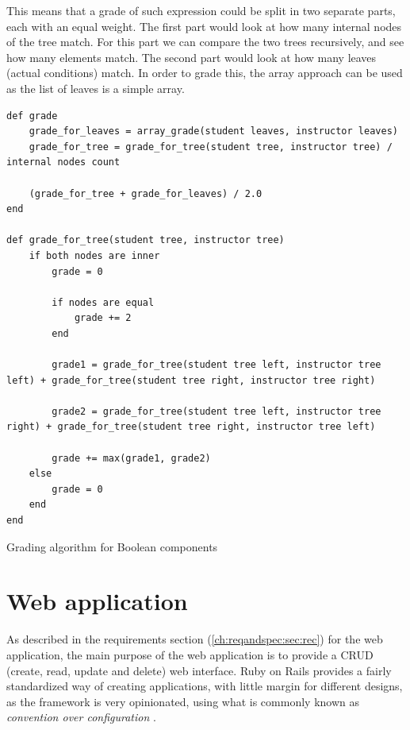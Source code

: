 This means that a grade of such expression could be split in two separate parts, each with an equal weight. The first part would look at how many internal nodes of the tree match. For this part we can compare the two trees recursively, and see how many elements match. The second part would look at how many leaves (actual conditions) match. In order to grade this, the array approach can be used as the list of leaves is a simple array.

\begin{code}
\begin{verbatim}
def grade
    grade_for_leaves = array_grade(student leaves, instructor leaves)
    grade_for_tree = grade_for_tree(student tree, instructor tree) / internal nodes count
    
    (grade_for_tree + grade_for_leaves) / 2.0
end

def grade_for_tree(student tree, instructor tree)
    if both nodes are inner
        grade = 0
        
        if nodes are equal
            grade += 2
        end
        
        grade1 = grade_for_tree(student tree left, instructor tree left) + grade_for_tree(student tree right, instructor tree right)
        
        grade2 = grade_for_tree(student tree left, instructor tree right) + grade_for_tree(student tree right, instructor tree left)
        
        grade += max(grade1, grade2)
    else
        grade = 0
    end
end
\end{verbatim}
\caption{Grading algorithm for Boolean components }
\end{code}

\section{Web application}


As described in the requirements section (\ref{ch:reqandspec:sec:rec}) for the web application, the main purpose of the web application is to provide a CRUD (create, read, update and delete) web interface. Ruby on Rails provides a fairly standardized way of creating applications, with little margin for different designs, as the framework is very opinionated, using what is commonly known as \textit{convention over configuration} \citep{ruby_on_rails}.

